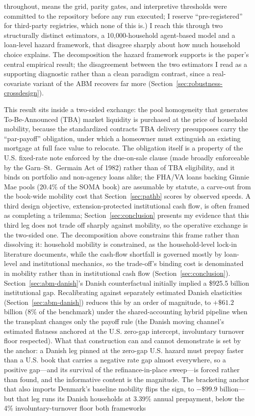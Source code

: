 \documentclass[12pt]{article}
\begin{document}
throughout, means the grid, parity gates, and interpretive thresholds were committed to the repository before any run executed; I reserve ``pre-registered'' for third-party registries, which none of this is.) I reach this through two structurally distinct estimators, a 10,000-household agent-based model and a loan-level hazard framework, that disagree sharply about how much household choice explains. The decomposition the hazard framework supports is the paper's central empirical result; the disagreement between the two estimators I read as a supporting diagnostic rather than a clean paradigm contrast, since a real-covariate variant of the ABM recovers far more (Section~\ref{sec:robustness-crossdesign}).

This result sits inside a two-sided exchange: the pool homogeneity that generates To-Be-Announced (TBA) market liquidity is purchased at the price of household mobility, because the standardized contracts TBA delivery presupposes carry the ``par-payoff'' obligation, under which a homeowner must extinguish an existing mortgage at full face value to relocate. The obligation itself is a property of the U.S. fixed-rate note enforced by the due-on-sale clause (made broadly enforceable by the Garn--St.~Germain Act of 1982) rather than of TBA eligibility, and it binds on portfolio and non-agency loans alike; the FHA/VA loans backing Ginnie Mae pools (20.4\% of the SOMA book) are assumable by statute, a carve-out from the book-wide mobility cost that Section~\ref{sec:pathb} scores by observed speeds. A third design objective, extension-protected institutional cash flow, is often framed as completing a trilemma; Section~\ref{sec:conclusion} presents my evidence that this third leg does not trade off sharply against mobility, so the operative exchange is the two-sided one. The decomposition above constrains this frame rather than dissolving it: household mobility is constrained, as the household-level lock-in literature documents, while the cash-flow shortfall is governed mostly by loan-level and institutional mechanics, so the trade-off's binding cost is denominated in mobility rather than in institutional cash flow (Section~\ref{sec:conclusion}). Section~\ref{sec:abm-danish}'s Danish counterfactual initially implied a \$925.5 billion institutional gap. Recalibrating against separately estimated Danish elasticities (Section~\ref{sec:abm-danish}) reduces this by an order of magnitude, to $+\$61.2$ billion (8\% of the benchmark) under the shared-accounting hybrid pipeline when the transplant changes only the payoff rule (the Danish moving channel's estimated flatness anchored at the U.S. zero-gap intercept, involuntary turnover floor respected). What that construction can and cannot demonstrate is set by the anchor: a Danish leg pinned at the zero-gap U.S. hazard must prepay faster than a U.S. book that carries a negative rate gap almost everywhere, so a positive gap---and its survival of the refinance-in-place sweep---is forced rather than found, and the informative content is the magnitude. The bracketing anchor that also imports Denmark's baseline mobility flips the sign, to $-\$99.9$ billion---but that leg runs its Danish households at 3.39\% annual prepayment, below the 4\% involuntary-turnover floor both frameworks 
\end{document}
